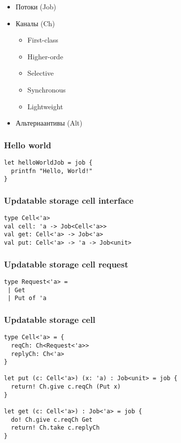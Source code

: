\documentclass{beamer}
\begin{document}
    \begin{frame} [fragile]

        \begin{itemize} \frametitle{Основные сущности}
        \item Потоки (Job)
        \item Каналы (Ch)
        \begin{itemize}
            \item First-class
            \item Higher-orde
            \item Selective
            \item Synchronous
            \item Lightweight
        \end{itemize}
        \item Альтернаантивы (Alt)
        \end{itemize}

    \end{frame}


    \begin{frame}[fragile]
        \frametitle{Hello world}
        \begin{verbatim}
let helloWorldJob = job {
  printfn "Hello, World!"
}
        \end{verbatim}
    \end{frame}

    \begin{frame}[fragile]
        \frametitle{Updatable storage cell interface}
        \begin{verbatim}
type Cell<'a>
val cell: 'a -> Job<Cell<'a>>
val get: Cell<'a> -> Job<'a>
val put: Cell<'a> -> 'a -> Job<unit>
        \end{verbatim}
    \end{frame}

    \begin{frame}[fragile]
        \frametitle{Updatable storage cell request}
        \begin{verbatim}
type Request<'a> =
 | Get
 | Put of 'a
        \end{verbatim}
    \end{frame}

    \begin{frame}[fragile]
        \frametitle{Updatable storage cell}
        \begin{verbatim}
type Cell<'a> = {
  reqCh: Ch<Request<'a>>
  replyCh: Ch<'a>
}

let put (c: Cell<'a>) (x: 'a) : Job<unit> = job {
  return! Ch.give c.reqCh (Put x)
}

let get (c: Cell<'a>) : Job<'a> = job {
  do! Ch.give c.reqCh Get
  return! Ch.take c.replyCh
}
        \end{verbatim}
    \end{frame}
\end{document}
